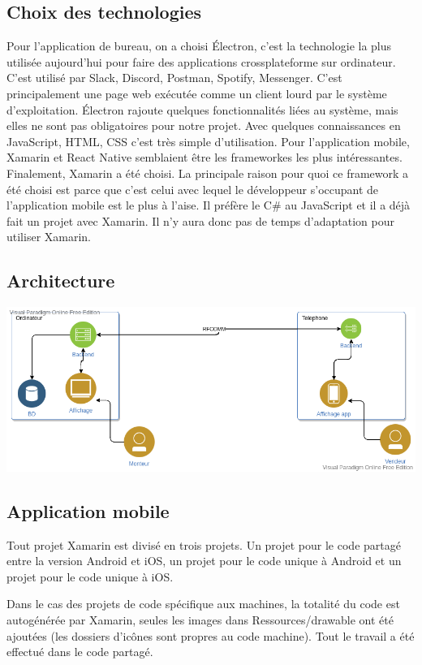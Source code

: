 \documentclass[12pt,fleqn]{article}
\begin{document}
\subsection{Choix des technologies}
Pour l'application de bureau, on a choisi Électron, c'est la technologie la plus utilisée aujourd'hui pour faire des applications crossplateforme sur ordinateur. C'est utilisé par Slack, Discord, Postman, Spotify, Messenger. C'est principalement une page web exécutée comme un client lourd par le système d'exploitation. Électron rajoute quelques fonctionnalités liées au système, mais elles ne sont pas obligatoires pour notre projet. Avec quelques connaissances en JavaScript, HTML, CSS c'est très simple d'utilisation.  Pour l'application mobile, Xamarin et React Native semblaient être les frameworkes les plus intéressantes. Finalement, Xamarin a été choisi. La principale raison pour quoi ce framework a été choisi est parce que c’est celui avec lequel le développeur s’occupant de l’application mobile est le plus à l’aise. Il préfère le C\# au JavaScript et il a déjà fait un projet avec Xamarin. Il n’y aura donc pas de temps d’adaptation pour utiliser Xamarin.

\subsection{Architecture}

\includegraphics[scale=0.5]{images/architecture_ift592.png}

\subsection{Application mobile}
Tout projet Xamarin est divisé en trois projets.  Un projet pour le code partagé entre la version Android et iOS, un projet pour le code unique à Android et un projet pour le code unique à iOS.

Dans le cas des projets de code spécifique aux machines, la totalité du code est autogénérée par Xamarin, seules les images dans Ressources/drawable ont été ajoutées (les dossiers d’icônes sont propres au code machine). Tout le  travail a été effectué dans le code partagé.
\end{document}
